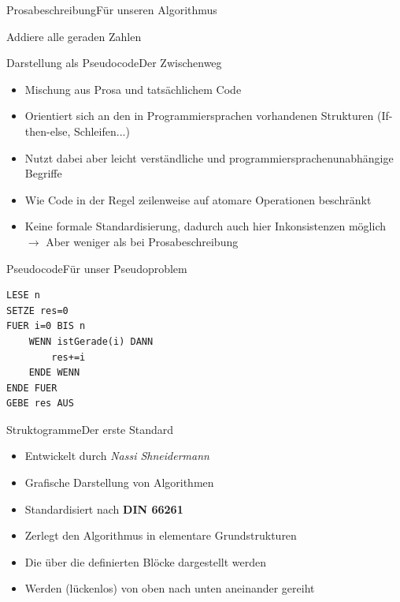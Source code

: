 \begin{frame}{Prosabeschreibung}{Für unseren Algorithmus}
    \begin{alertblock}{Addiere alle geraden Zahlen}
    
    
      
    
    \end{alertblock}
\end{frame}

\begin{frame}{Darstellung als Pseudocode}{Der Zwischenweg}
    \begin{itemize}
        \item Mischung aus Prosa und tatsächlichem Code
        \item Orientiert sich an den in Programmiersprachen vorhandenen Strukturen (If-then-else, Schleifen...)
        \item Nutzt dabei aber leicht verständliche und programmiersprachenunabhängige Begriffe
        \item Wie Code in der Regel zeilenweise auf atomare Operationen beschränkt
        \item Keine formale Standardisierung, dadurch auch hier Inkonsistenzen möglich $\rightarrow$ Aber weniger als bei Prosabeschreibung
    \end{itemize}
\end{frame}

\begin{frame}[fragile]{Pseudocode}{Für unser Pseudoproblem}
\lstset{style=pseudo}
\begin{lstlisting}
LESE n
SETZE res=0
FUER i=0 BIS n
    WENN istGerade(i) DANN
        res+=i
    ENDE WENN
ENDE FUER
GEBE res AUS
\end{lstlisting}
\end{frame}

\begin{frame}{Struktogramme}{Der erste Standard}
    \begin{itemize}
        \item Entwickelt durch \textit{Nassi Shneidermann}
        \item Grafische Darstellung von Algorithmen
        \item Standardisiert nach \textbf{DIN 66261}
        \item Zerlegt den Algorithmus in elementare Grundstrukturen
        \item Die über die definierten Blöcke dargestellt werden
        \item Werden (lückenlos) von oben nach unten aneinander gereiht
    \end{itemize}
\end{frame}

